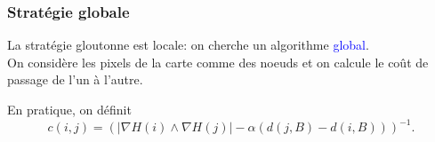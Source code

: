 \documentclass[11pt]{beamer}
\begin{document}
\begin{frame}

\frametitle{Stratégie globale}
La stratégie gloutonne est locale: on cherche un algorithme \textcolor{blue}{global}.\\
On considère les pixels de la carte comme des noeuds et on calcule le coût de passage de l'un à l'autre.
\begin{center}
\end{center}
En pratique, on définit
\begin{equation*}
  c(i,j) = \left( \left| \nabla H(i) \wedge \nabla H(j) \right| - \alpha \left( d(j,B) - d(i,B) \right) \right)^{-1} .
\end{equation*}


\end{frame}
\end{document}

